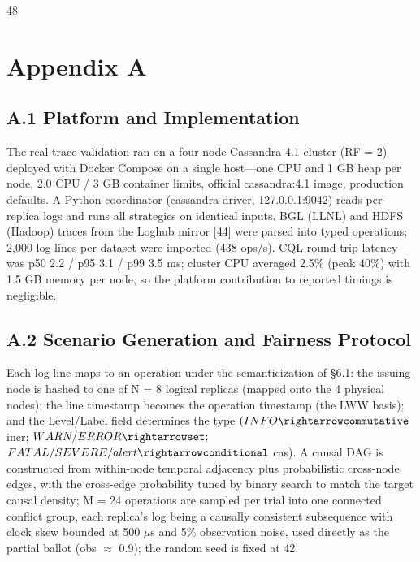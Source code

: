 \documentclass[journal]{IEEEtran}
\begin{document}
\begin{thebibliography}{48}
\appendix
\section*{Appendix A}
\subsection{A.1 Platform and Implementation}
The real-trace validation ran on a four-node Cassandra 4.1 cluster (RF = 2) deployed with Docker Compose on a single host—one CPU and 1 GB heap per node, 2.0 CPU / 3 GB container limits, official cassandra:4.1 image, production defaults. A Python coordinator (cassandra-driver, 127.0.0.1:9042) reads per-replica logs and runs all strategies on identical inputs. BGL (LLNL) and HDFS (Hadoop) traces from the Loghub mirror [44] were parsed into typed operations; 2,000 log lines per dataset were imported (438 ops/s). CQL round-trip latency was p50 2.2 / p95 3.1 / p99 3.5 ms; cluster CPU averaged 2.5\% (peak 40\%) with 1.5 GB memory per node, so the platform contribution to reported timings is negligible.

\subsection{A.2 Scenario Generation and Fairness Protocol}
Each log line maps to an operation under the semanticization of §6.1: the issuing node is hashed to one of N = 8 logical replicas (mapped onto the 4 physical nodes); the line timestamp becomes the operation timestamp (the LWW basis); and the Level/Label field determines the type $(INFO\rightarrowcommutative$ incr; $WARN/ERROR\rightarrowset;$ $FATAL/SEVERE/alert\rightarrowconditional$ cas). A causal DAG is constructed from within-node temporal adjacency plus probabilistic cross-node edges, with the cross-edge probability tuned by binary search to match the target causal density; M = 24 operations are sampled per trial into one connected conflict group, each replica's log being a causally consistent subsequence with clock skew bounded at 500 $\mu$s and 5\% observation noise, used directly as the partial ballot (obs $\approx$ 0.9); the random seed is fixed at 42.


\end{thebibliography}
\end{document}
